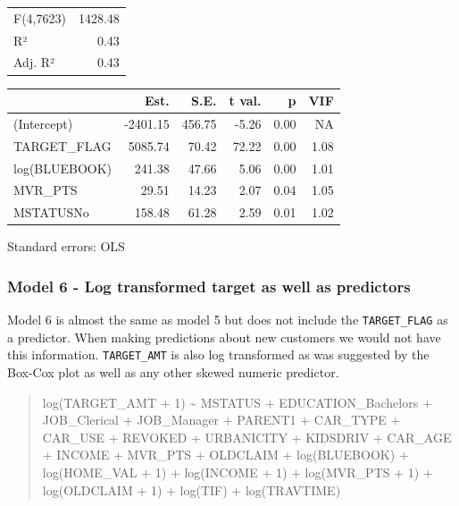 \documentclass[]{article}
\begin{document}
\begin{table}[!h]
\centering
\begin{tabular}{lr}
\toprule
\rowcolor{gray!6}  F(4,7623) & 1428.48\\
R² & 0.43\\
\rowcolor{gray!6}  Adj. R² & 0.43\\
\bottomrule
\end{tabular}
\end{table}

\begin{table}[!h]
\centering
\begin{threeparttable}
\begin{tabular}{lrrrrr}
\toprule
  & Est. & S.E. & t val. & p & VIF\\
\midrule
\rowcolor{gray!6}  (Intercept) & -2401.15 & 456.75 & -5.26 & 0.00 & NA\\
TARGET\_FLAG & 5085.74 & 70.42 & 72.22 & 0.00 & 1.08\\
\rowcolor{gray!6}  log(BLUEBOOK) & 241.38 & 47.66 & 5.06 & 0.00 & 1.01\\
MVR\_PTS & 29.51 & 14.23 & 2.07 & 0.04 & 1.05\\
\rowcolor{gray!6}  MSTATUSNo & 158.48 & 61.28 & 2.59 & 0.01 & 1.02\\
\bottomrule
\end{tabular}
\begin{tablenotes}
\item Standard errors: OLS
\end{tablenotes}
\end{threeparttable}
\end{table}

\newpage

\subsubsection{Model 6 - Log transformed target as well as
predictors}\label{model-6---log-transformed-target-as-well-as-predictors}

Model 6 is almost the same as model 5 but does not include the
\texttt{TARGET\_FLAG} as a predictor. When making predictions about new
customers we would not have this information. \texttt{TARGET\_AMT} is
also log transformed as was suggested by the Box-Cox plot as well as any
other skewed numeric predictor.

\begin{quote}
log(TARGET\_AMT + 1) \textasciitilde{} MSTATUS + EDUCATION\_Bachelors +
JOB\_Clerical + JOB\_Manager + PARENT1 + CAR\_TYPE + CAR\_USE + REVOKED
+ URBANICITY + KIDSDRIV + CAR\_AGE + INCOME + MVR\_PTS + OLDCLAIM +
log(BLUEBOOK) + log(HOME\_VAL + 1) + log(INCOME + 1) + log(MVR\_PTS + 1)
+ log(OLDCLAIM + 1) + log(TIF) + log(TRAVTIME)
\end{quote}
\end{document}
